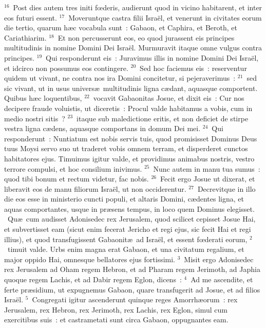 ${}^{16}$~Post dies autem tres initi fœderis, audierunt quod in vicino habitarent, et inter eos futuri essent.
${}^{17}$~Moveruntque castra filii Isra\"el, et venerunt in civitates eorum die tertio, quarum h\ae c vocabula sunt~: Gabaon, et Caphira, et Beroth, et Cariathiarim.
${}^{18}$~Et non percusserunt eos, eo quod jurassent eis principes multitudinis in nomine Domini Dei Isra\"el. Murmuravit itaque omne vulgus contra principes.
${}^{19}$~Qui responderunt eis~: Juravimus illis in nomine Domini Dei Isra\"el, et idcirco non possumus eos contingere.
${}^{20}$~Sed hoc faciemus eis~: reserventur quidem ut vivant, ne contra nos ira Domini concitetur, si pejeraverimus~:
${}^{21}$~sed sic vivant, ut in usus univers\ae\ multitudinis ligna c\ae dant, aquasque comportent. Quibus h\ae c loquentibus,
${}^{22}$~vocavit Gabaonitas Josue, et dixit eis~: Cur nos decipere fraude voluistis, ut diceretis~: Procul valde habitamus a vobis, cum in medio nostri sitis~?
${}^{23}$~itaque sub maledictione eritis, et non deficiet de stirpe vestra ligna c\ae dens, aquasque comportans in domum Dei mei.
${}^{24}$~Qui responderunt~: Nuntiatum est nobis servis tuis, quod promisisset Dominus Deus tuus Moysi servo suo ut traderet vobis omnem terram, et disperderet cunctos habitatores ejus. Timuimus igitur valde, et providimus animabus nostris, vestro terrore compulsi, et hoc consilium inivimus.
${}^{25}$~Nunc autem in manu tua sumus~: quod tibi bonum et rectum videtur, fac nobis.
${}^{26}$~Fecit ergo Josue ut dixerat, et liberavit eos de manu filiorum Isra\"el, ut non occiderentur.
${}^{27}$~Decrevitque in illo die eos esse in ministerio cuncti populi, et altaris Domini, c\ae dentes ligna, et aquas comportantes, usque in pr\ae sens tempus, in loco quem Dominus elegisset.
~\lettrine[lines=10,image=true,loversize=0.05,lraise=-0.03]{Q}{}u\ae\ cum audisset Adonisedec rex Jerusalem, quod scilicet cepisset Josue Hai, et subvertisset eam (sicut enim fecerat Jericho et regi ejus, sic fecit Hai et regi illius), et quod transfugissent Gabaonit\ae\ ad Isra\"el, et essent fœderati eorum,
${}^{2}$~timuit valde. Urbs enim magna erat Gabaon, et una civitatum regalium, et major oppido Hai, omnesque bellatores ejus fortissimi.
${}^{3}$~Misit ergo Adonisedec rex Jerusalem ad Oham regem Hebron, et ad Pharam regem Jerimoth, ad Japhia quoque regem Lachis, et ad Dabir regem Eglon, dicens~:
${}^{4}$~Ad me ascendite, et ferte pr\ae sidium, ut expugnemus Gabaon, quare transfugerit ad Josue, et ad filios Isra\"el.
${}^{5}$~Congregati igitur ascenderunt quinque reges Amorrh\ae orum~: rex Jerusalem, rex Hebron, rex Jerimoth, rex Lachis, rex Eglon, simul cum exercitibus suis~: et castrametati sunt circa Gabaon, oppugnantes eam.


